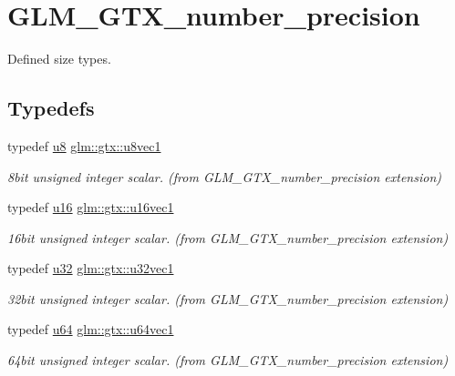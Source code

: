 \hypertarget{group__gtx__number__precision}{}\section{G\+L\+M\+\_\+\+G\+T\+X\+\_\+number\+\_\+precision}
\label{group__gtx__number__precision}


Defined size types.  


\subsection*{Typedefs}
\begin{DoxyCompactItemize}
\item 
typedef \mbox{\hyperlink{group__gtc__type__precision_ga5e3dc67373d5068997d2d9f41c9024d2}{u8}} \mbox{\hyperlink{group__gtx__number__precision_ga35ae7849593a354420e4f52d1b36c2d6}{glm\+::gtx\+::u8vec1}}
\begin{DoxyCompactList}\small\item\em 8bit unsigned integer scalar. (from G\+L\+M\+\_\+\+G\+T\+X\+\_\+number\+\_\+precision extension) \end{DoxyCompactList}\item 
typedef \mbox{\hyperlink{group__gtc__type__precision_gae7a1571503f83d2264ddfa705a6b082a}{u16}} \mbox{\hyperlink{group__gtx__number__precision_ga807d7e5f24e981b1575bd40ca159781d}{glm\+::gtx\+::u16vec1}}
\begin{DoxyCompactList}\small\item\em 16bit unsigned integer scalar. (from G\+L\+M\+\_\+\+G\+T\+X\+\_\+number\+\_\+precision extension) \end{DoxyCompactList}\item 
typedef \mbox{\hyperlink{group__gtc__type__precision_ga54e837745059fd29017bed71cfa0a8db}{u32}} \mbox{\hyperlink{group__gtx__number__precision_gac46a7890b20928df83e734c3ea9557d4}{glm\+::gtx\+::u32vec1}}
\begin{DoxyCompactList}\small\item\em 32bit unsigned integer scalar. (from G\+L\+M\+\_\+\+G\+T\+X\+\_\+number\+\_\+precision extension) \end{DoxyCompactList}\item 
typedef \mbox{\hyperlink{group__gtc__type__precision_ga71cedd4972f9cb1a5e14dfe5ab83ecd7}{u64}} \mbox{\hyperlink{group__gtx__number__precision_ga92812a1d7e746bcaba61d2f5a64afc52}{glm\+::gtx\+::u64vec1}}
\begin{DoxyCompactList}\small\item\em 64bit unsigned integer scalar. (from G\+L\+M\+\_\+\+G\+T\+X\+\_\+number\+\_\+precision extension) \end{DoxyCompactList}\item 

\end{DoxyCompactItemize}
